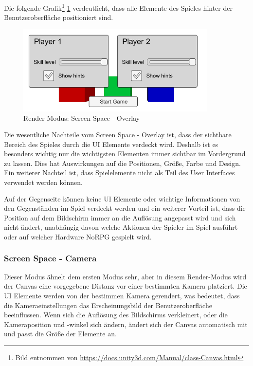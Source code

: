 			Die folgende Grafik\footnote{Bild entnommen von \url{https://docs.unity3d.com/Manual/class-Canvas.html}} \ref{renderOverlay} verdeutlicht, dass alle Elemente des Spieles hinter der Benutzeroberfläche positioniert sind.
			
			\begin{figure}[htbp]
				\centering 
				\label{renderOverlay}
				\includegraphics[width=10cm]{pics/CanvasOverlay.png}
				\caption{Render-Modus: Screen Space - Overlay}
			\end{figure}
			
			Die wesentliche Nachteile vom Screen Space - Overlay ist, dass der sichtbare Bereich des Spieles durch die UI Elemente verdeckt wird. Deshalb ist es besonders wichtig nur die wichtigsten Elementen immer sichtbar im Vordergrund zu lassen. Dies hat Auswirkungen auf die Positionen, Größe, Farbe und Design. Ein weiterer Nachteil ist, dass Spielelemente nicht als Teil des User Interfaces verwendet werden können. 
			
			Auf der Gegenseite können keine UI Elemente oder wichtige Informationen von den Gegenständen im Spiel verdeckt werden und ein weiterer Vorteil ist, dass die Position auf dem Bildschirm immer an die Auflösung angepasst wird und sich nicht ändert, unabhängig davon welche Aktionen der Spieler im Spiel ausführt oder auf welcher Hardware NoRPG gespielt wird.

		\subsubsection{Screen Space - Camera}
			Dieser Modus ähnelt dem ersten Modus sehr, aber in diesem Render-Modus wird der Canvas eine vorgegebene Distanz vor einer bestimmten Kamera platziert. Die UI Elemente werden von der bestimmen Kamera gerendert, was bedeutet, dass die Kameraeinstellungen das Erscheinungsbild der Benutzeroberfläche beeinflussen. Wenn sich die Auflösung des Bildschirms verkleinert, oder die Kameraposition und -winkel sich ändern, ändert sich der Canvas automatisch mit und passt die Größe der Elemente an.
			
